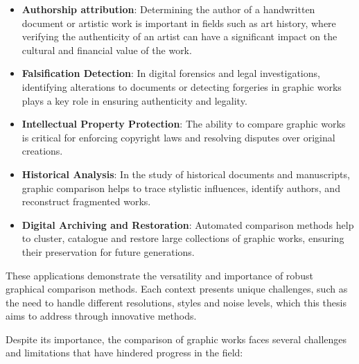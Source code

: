 \begin{toReview}
		\begin{itemize}
			\item \textbf{Authorship attribution}: Determining the author of a handwritten document or artistic work is important in fields such as art history, where verifying the authenticity of an artist can have a significant impact on the cultural and financial value of the work.
			\item \textbf{Falsification Detection}: In digital forensics and legal investigations, identifying alterations to documents or detecting forgeries in graphic works plays a key role in ensuring authenticity and legality.
			\item \textbf{Intellectual Property Protection}: The ability to compare graphic works is critical for enforcing copyright laws and resolving disputes over original creations.
			\item \textbf{Historical Analysis}: In the study of historical documents and manuscripts, graphic comparison helps to trace stylistic influences, identify authors, and reconstruct fragmented works.
			\item \textbf{Digital Archiving and Restoration}: Automated comparison methods help to cluster, catalogue and restore large collections of graphic works, ensuring their preservation for future generations.
		\end{itemize}

		\noindent These applications demonstrate the versatility and importance of robust graphical comparison methods. Each context presents unique challenges, such as the need to handle different resolutions, styles and noise levels, which this thesis aims to address through innovative methods.

		\bigskip
		\noindent Despite its importance, the comparison of graphic works faces several challenges and limitations that have hindered progress in the field:


\end{toReview}
